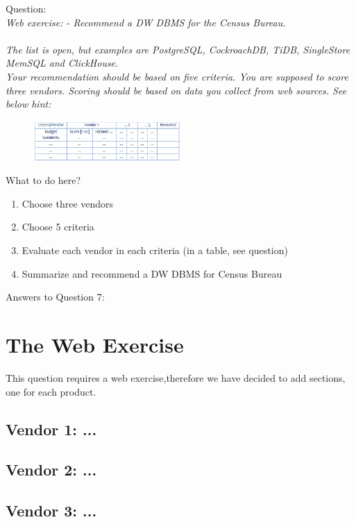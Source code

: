 Question:\\
\emph{
    Web exercise:
- Recommend a DW DBMS for the Census Bureau.\\\\ The list is open, but examples
are PostgreSQL, CockroachDB, TiDB, SingleStore MemSQL and ClickHouse.\\ Your
recommendation should be based on five criteria. You are supposed to score
three vendors. Scoring should be based on data you collect from web sources.
See below hint:
}

\begin{figure}[h] %
    \centering
    \includegraphics[width=0.5\textwidth]{Figures/Q7_QUESTION_table.PNG}
    \label{fig:my_image}
\end{figure}

What to do here?
\begin{enumerate}
    \item Choose three vendors
    \item Choose 5 criteria
    \item Evaluate each vendor in each criteria (in a table, see question)
    \item Summarize and recommend a DW DBMS for Census Bureau
  \end{enumerate}
\newpage Answers to Question 7:
\section{The Web Exercise}
This question requires a web exercise,therefore we have decided to add sections, one for each product. 

\subsection{Vendor 1: ...}
    
\subsection{Vendor 2: ...}
    
\subsection{Vendor 3: ...}

